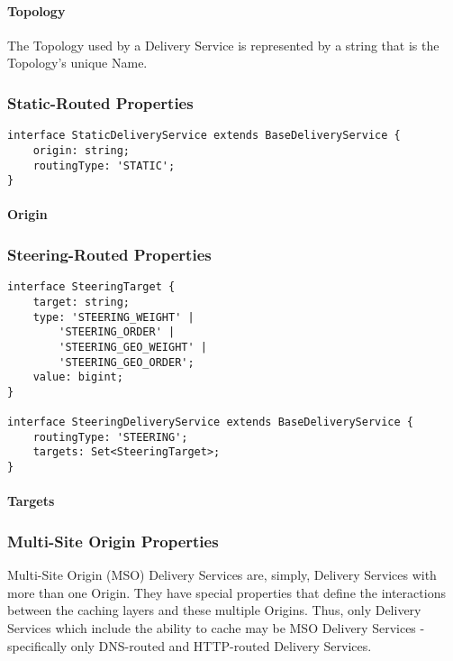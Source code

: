 \paragraph{Topology}
The Topology used by a Delivery Service is represented by a string that is the
Topology's unique Name.

\subsubsection{Static-Routed Properties}
\begin{codelisting}
\begin{verbatim}
interface StaticDeliveryService extends BaseDeliveryService {
	origin: string;
	routingType: 'STATIC';
}
\end{verbatim}
\end{codelisting}

\paragraph{Origin}

\subsubsection{Steering-Routed Properties}
\begin{codelisting}
\begin{verbatim}
interface SteeringTarget {
	target: string;
	type: 'STEERING_WEIGHT' |
		'STEERING_ORDER' |
		'STEERING_GEO_WEIGHT' |
		'STEERING_GEO_ORDER';
	value: bigint;
}

interface SteeringDeliveryService extends BaseDeliveryService {
	routingType: 'STEERING';
	targets: Set<SteeringTarget>;
}
\end{verbatim}
\end{codelisting}

\paragraph{Targets}

\subsubsection{Multi-Site Origin Properties\label{sec:mso-props}}
Multi-Site Origin (MSO) Delivery Services are, simply, Delivery Services with
more than one Origin. They have special properties that define the interactions
between the caching layers and these multiple Origins. Thus, only Delivery
Services which include the ability to cache may be MSO Delivery Services -
specifically only DNS-routed and HTTP-routed Delivery Services.

